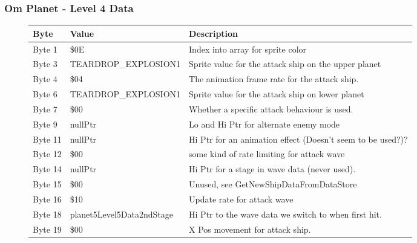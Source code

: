 \clearpage
\subsubsection{Om Planet - Level 4 Data}

\begin{figure}[H]
  {
  \setlength{\tabcolsep}{3.0pt}
  \setlength\cmidrulewidth{\heavyrulewidth} %
  \begin{adjustbox}{width=12cm}

\begin{tabular}{lll}
\toprule
 Byte    & Value                     & Description                                                        \\
\midrule
 Byte 1  & \$0E                       & Index into array for sprite color                                  \\
 Byte 3  & TEARDROP\_EXPLOSION1       & Sprite value for the attack ship on the upper planet               \\
 Byte 4  & \$04                       & The animation frame rate for the attack ship.                      \\
 Byte 6  & TEARDROP\_EXPLOSION1       & Sprite value for the attack ship on lower planet                   \\
 Byte 7  & \$00                       & Whether a specific attack behaviour is used.                       \\
 Byte 9  & nullPtr                   & Lo and Hi Ptr for alternate enemy mode                             \\
 Byte 11 & nullPtr                   & Hi Ptr for an animation effect (Doesn't seem to be used?)?         \\
 Byte 12 & \$00                       & some kind of rate limiting for attack wave                         \\
 Byte 14 & nullPtr                   & Hi Ptr for a stage in wave data (never used).                      \\
 Byte 15 & \$00                       & Unused, see GetNewShipDataFromDataStore                            \\
 Byte 16 & \$10                       & Update rate for attack wave                                        \\
 Byte 18 & planet5Level5Data2ndStage & Hi Ptr to the wave data we switch to when first hit.               \\
 Byte 19 & \$00                       & X Pos movement for attack ship.                                    \\

\end{tabular}
\end{adjustbox}}
\end{figure}
